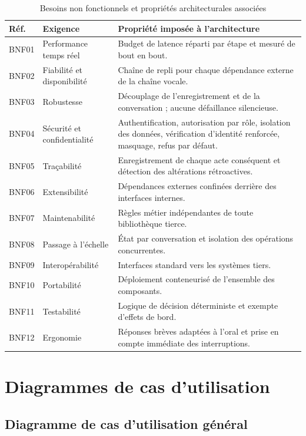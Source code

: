 \begin{table}[H]
\centering
\renewcommand{\arraystretch}{1.2}
\begin{tabular}{|p{1.3cm}|p{3.7cm}|p{8.9cm}|}
\hline
\textbf{Réf.} & \textbf{Exigence} & \textbf{Propriété imposée à l'architecture} \\
\hline
BNF01 & Performance temps réel & Budget de latence réparti par étape et mesuré de bout en bout. \\
\hline
BNF02 & Fiabilité et disponibilité & Chaîne de repli pour chaque dépendance externe de la chaîne vocale. \\
\hline
BNF03 & Robustesse & Découplage de l'enregistrement et de la conversation ; aucune défaillance silencieuse. \\
\hline
BNF04 & Sécurité et confidentialité & Authentification, autorisation par rôle, isolation des données, vérification d'identité renforcée, masquage, refus par défaut. \\
\hline
BNF05 & Traçabilité & Enregistrement de chaque acte conséquent et détection des altérations rétroactives. \\
\hline
BNF06 & Extensibilité & Dépendances externes confinées derrière des interfaces internes. \\
\hline
BNF07 & Maintenabilité & Règles métier indépendantes de toute bibliothèque tierce. \\
\hline
BNF08 & Passage à l'échelle & État par conversation et isolation des opérations concurrentes. \\
\hline
BNF09 & Interopérabilité & Interfaces standard vers les systèmes tiers. \\
\hline
BNF10 & Portabilité & Déploiement conteneurisé de l'ensemble des composants. \\
\hline
BNF11 & Testabilité & Logique de décision déterministe et exempte d'effets de bord. \\
\hline
BNF12 & Ergonomie & Réponses brèves adaptées à l'oral et prise en compte immédiate des interruptions. \\
\hline
\end{tabular}
\caption{Besoins non fonctionnels et propriétés architecturales associées}
\label{tab:bnf}
\end{table}

\section{Diagrammes de cas d'utilisation}

\subsection{Diagramme de cas d'utilisation général}

